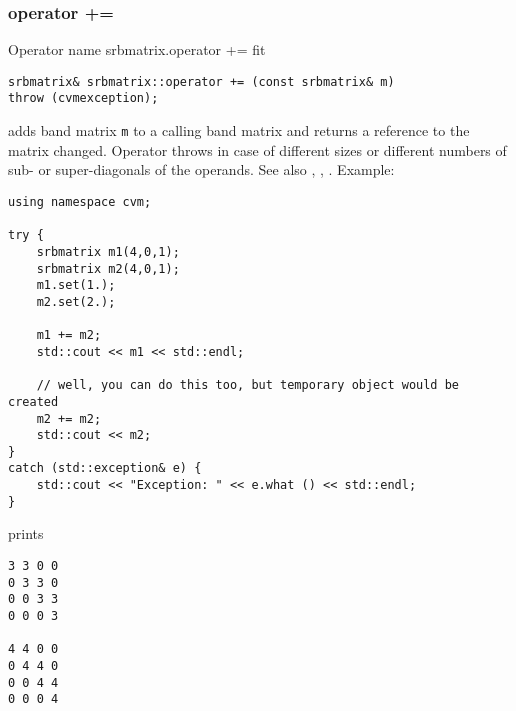 \subsubsection{operator +=}
Operator%
\pdfdest name {srbmatrix.operator +=} fit
\begin{verbatim}
srbmatrix& srbmatrix::operator += (const srbmatrix& m) 
throw (cvmexception);
\end{verbatim}
adds  band matrix \verb"m" to a calling band matrix 
and returns a reference to
the matrix changed.
Operator throws  
in case of different sizes or different numbers of sub- or super-diagonals
of the operands.
See also ,
,
.
Example:
\begin{Verbatim}
using namespace cvm;

try {
    srbmatrix m1(4,0,1);
    srbmatrix m2(4,0,1);
    m1.set(1.);
    m2.set(2.);

    m1 += m2;
    std::cout << m1 << std::endl;

    // well, you can do this too, but temporary object would be created
    m2 += m2; 
    std::cout << m2;
}
catch (std::exception& e) {
    std::cout << "Exception: " << e.what () << std::endl;
}
\end{Verbatim}
prints
\begin{Verbatim}
3 3 0 0
0 3 3 0
0 0 3 3
0 0 0 3

4 4 0 0
0 4 4 0
0 0 4 4
0 0 0 4
\end{Verbatim}
\newpage




